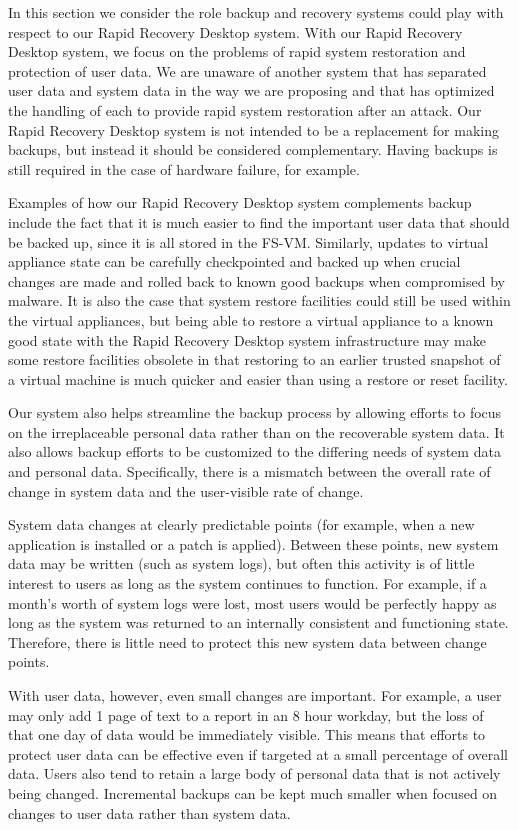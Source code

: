 In this section we consider the role backup and recovery systems could play with respect to our Rapid Recovery Desktop system. With our Rapid Recovery Desktop system, we focus on the problems of rapid system restoration and protection of user data. We are unaware of another system that has separated user data and system data in the way we are proposing and that has optimized the handling of each to provide rapid system restoration after an attack. Our Rapid Recovery Desktop system is not intended to be a replacement for making backups, but instead it should be considered complementary. Having backups is still required in the case of hardware failure, for example. 

Examples of how our Rapid Recovery Desktop system complements backup include the fact that it is much easier to find the important user data that should be backed up, since it is all stored in the FS-VM. Similarly, updates to virtual appliance state can be carefully checkpointed and backed up when crucial changes are made and rolled back to known good backups when compromised by malware. It is also the case that system restore facilities could still be used within the virtual appliances, but being able to restore a virtual appliance to a known good state with the Rapid Recovery Desktop system infrastructure may make some restore facilities obsolete in that restoring to an earlier trusted snapshot of a virtual machine is much quicker and easier than using a restore or reset facility.

Our system also helps streamline the backup process by allowing efforts to focus on the irreplaceable personal data rather than on the recoverable system data. It also allows backup efforts to be customized to the differing needs of system data and personal data. Specifically, there is a mismatch between the overall rate of change in system data and the user-visible rate of change.
 
System data changes at clearly predictable points (for example, when a new application is installed or a patch is applied). Between these points, new system data may be written (such as system logs), but often this activity is of little interest to users as long as the system continues to function. For example, if a month’s worth of system logs were lost, most users would be perfectly happy as long as the system was returned to an internally consistent and functioning state. Therefore, there is little need to protect this new system data between change points.
 
With user data, however, even small changes are important. For example, a user may only add 1 page of text to a report in an 8 hour workday, but the loss of that one day of data would be immediately visible. This means that efforts to protect user data can be effective even if targeted at a small percentage of overall data. Users also tend to retain a large body of personal data that is not actively being changed. Incremental backups can be kept much smaller when focused on changes to user data rather than system data.

